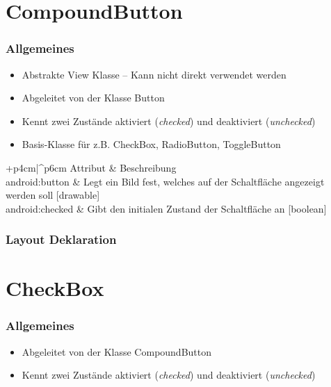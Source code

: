 \section{CompoundButton}
\begin{frame}
   \frametitle{Allgemeines}
   \begin{itemize}
      \item Abstrakte View Klasse -- Kann nicht direkt verwendet werden
      \item Abgeleitet von der Klasse Button
      \item Kennt zwei Zustände aktiviert (\emph{checked}) und deaktiviert (\emph{unchecked})
      \item Basis-Klasse für z.B. CheckBox, RadioButton, ToggleButton
   \end{itemize}

	\begin{attrDesc}{+p{4cm}|^p{6cm}}
		Attribut & Beschreibung\\
		\hline
		android:button & Legt ein Bild fest, welches auf 
		   der Schaltfläche angezeigt werden soll [drawable]\\
		android:checked & Gibt den initialen Zustand der Schaltfläche an [boolean]\\
	\end{attrDesc}
\end{frame}

\begin{frame}
   \frametitle{Layout Deklaration}
	
\end{frame}

\section{CheckBox}
\begin{frame}
   \frametitle{Allgemeines}
   \begin{itemize}
      \item Abgeleitet von der Klasse CompoundButton
      \item Kennt zwei Zustände aktiviert (\emph{checked}) und deaktiviert (\emph{unchecked})
   \end{itemize}

	
\end{frame}

